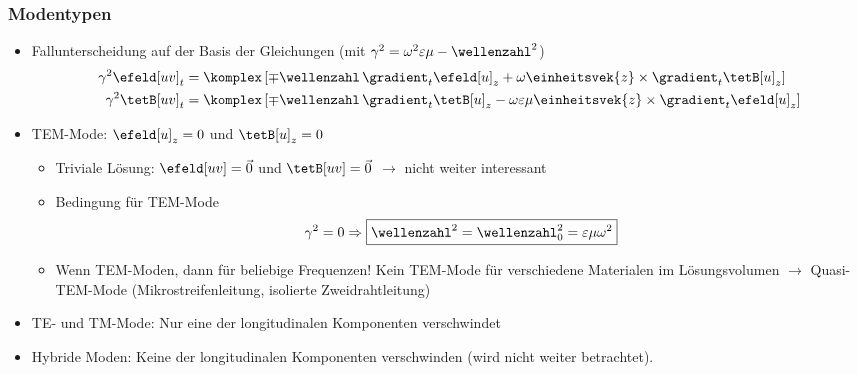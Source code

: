 \begin{frame}
  \frametitle{Modentypen}
  \begin{itemize}[<+->]
  \item \alert{Fallunterscheidung} auf der Basis der Gleichungen (mit \(\gamma^2= \omega^2\varepsilon\mu - \wellenzahl^2\))
    \begin{align*}
      \gamma^2\efeld[uv]_t &= \komplex \left[ \mp \wellenzahl\, \gradient_t \efeld[u]_{z} + \omega  \einheitsvek{z}\times\gradient_t \tetB[u]_{z}\right]\\
      \gamma^2\tetB[uv]_t &= \komplex \left[ \mp \wellenzahl\, \gradient_t \tetB[u]_{z} - \omega\varepsilon\mu  \einheitsvek{z}\times\gradient_t \efeld[u]_{z}\right]
    \end{align*}
  \item \alert{TEM-Mode}: \(\efeld[u]_z=0\) und \(\tetB[u]_z=0\)
    \begin{itemize}[<+->]
    \item Triviale Lösung: \(\efeld[uv]=\vec{0}\) und \(\tetB[uv]=\vec{0}\) \(\to\) nicht weiter interessant
    \item \alert{Bedingung für TEM-Mode}
      \begin{equation*}
        \gamma^2=0 \Rightarrow \boxed{\wellenzahl^2 = \wellenzahl_0^2= \varepsilon\mu\omega^2}
      \end{equation*}
      \item Wenn TEM-Moden, dann für beliebige Frequenzen! Kein TEM-Mode für verschiedene Materialen im Lösungsvolumen \(\to\) \alert{Quasi-TEM-Mode} (Mikrostreifenleitung, isolierte Zweidrahtleitung)
      \end{itemize}
    \item \alert{TE- und TM-Mode}: Nur eine der longitudinalen Komponenten verschwindet
      \item \alert{Hybride Moden}: Keine der longitudinalen Komponenten verschwinden (wird nicht weiter betrachtet). 
    \end{itemize}
\end{frame}


